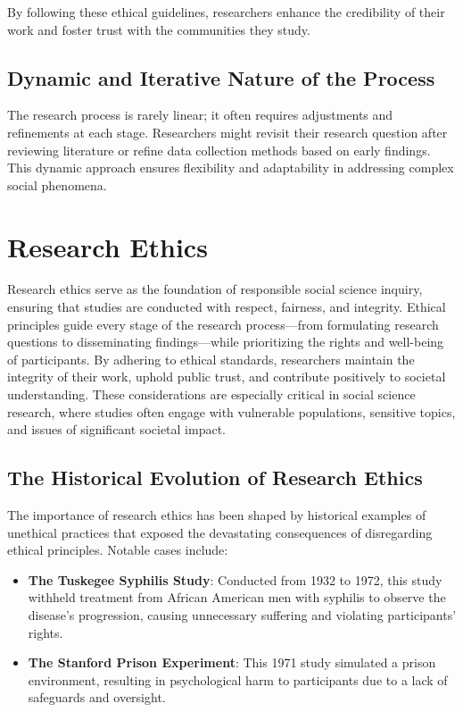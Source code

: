 \documentclass[
]{book}
\providecommand{\tightlist}{%
  \setlength{\itemsep}{0pt}\setlength{\parskip}{0pt}}
\begin{document}
By following these ethical guidelines, researchers enhance the credibility of their work and foster trust with the communities they study.

\subsection*{Dynamic and Iterative Nature of the Process}\label{dynamic-and-iterative-nature-of-the-process}

The research process is rarely linear; it often requires adjustments and refinements at each stage. Researchers might revisit their research question after reviewing literature or refine data collection methods based on early findings. This dynamic approach ensures flexibility and adaptability in addressing complex social phenomena.

\section{Research Ethics}\label{research-ethics}

Research ethics serve as the foundation of responsible social science inquiry, ensuring that studies are conducted with respect, fairness, and integrity. Ethical principles guide every stage of the research process---from formulating research questions to disseminating findings---while prioritizing the rights and well-being of participants. By adhering to ethical standards, researchers maintain the integrity of their work, uphold public trust, and contribute positively to societal understanding. These considerations are especially critical in social science research, where studies often engage with vulnerable populations, sensitive topics, and issues of significant societal impact.

\subsection*{The Historical Evolution of Research Ethics}\label{the-historical-evolution-of-research-ethics}

The importance of research ethics has been shaped by historical examples of unethical practices that exposed the devastating consequences of disregarding ethical principles. Notable cases include:

\begin{itemize}
\tightlist
\item
  \textbf{The Tuskegee Syphilis Study}: Conducted from 1932 to 1972, this study withheld treatment from African American men with syphilis to observe the disease's progression, causing unnecessary suffering and violating participants' rights.
\item
  \textbf{The Stanford Prison Experiment}: This 1971 study simulated a prison environment, resulting in psychological harm to participants due to a lack of safeguards and oversight.
\end{itemize}
\end{document}
